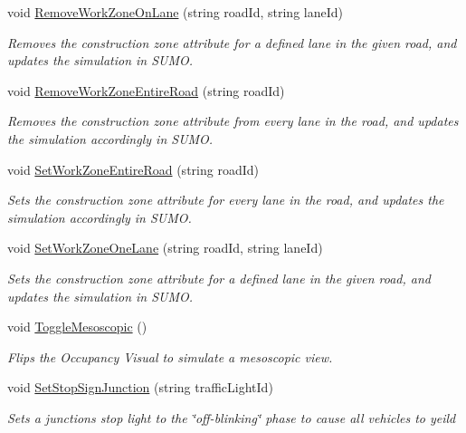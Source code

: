 \begin{DoxyCompactItemize}
\item 
void \mbox{\hyperlink{class_traci_controller_af8e5c5fefc5582cd12aeaca1b0663ac4}{Remove\+Work\+Zone\+On\+Lane}} (string road\+Id, string lane\+Id)
\begin{DoxyCompactList}\small\item\em Removes the construction zone attribute for a defined lane in the given road, and updates the simulation in S\+U\+MO. \end{DoxyCompactList}\item 
void \mbox{\hyperlink{class_traci_controller_a9678133938b5cf28566121ab6672dc34}{Remove\+Work\+Zone\+Entire\+Road}} (string road\+Id)
\begin{DoxyCompactList}\small\item\em Removes the construction zone attribute from every lane in the road, and updates the simulation accordingly in S\+U\+MO. \end{DoxyCompactList}\item 
void \mbox{\hyperlink{class_traci_controller_ae16a322e3cb2b298a8f52ceaa6661171}{Set\+Work\+Zone\+Entire\+Road}} (string road\+Id)
\begin{DoxyCompactList}\small\item\em Sets the construction zone attribute for every lane in the road, and updates the simulation accordingly in S\+U\+MO. \end{DoxyCompactList}\item 
void \mbox{\hyperlink{class_traci_controller_a5cb4324d12175bb8007433226d988561}{Set\+Work\+Zone\+One\+Lane}} (string road\+Id, string lane\+Id)
\begin{DoxyCompactList}\small\item\em Sets the construction zone attribute for a defined lane in the given road, and updates the simulation in S\+U\+MO. \end{DoxyCompactList}\item 
void \mbox{\hyperlink{class_traci_controller_a14b200d6e8bf71d6ae2391801b6eb51a}{Toggle\+Mesoscopic}} ()
\begin{DoxyCompactList}\small\item\em Flips the Occupancy Visual to simulate a mesoscopic view. \end{DoxyCompactList}\item 
void \mbox{\hyperlink{class_traci_controller_a033fdbe17b1d457bc59de0c2cdbe13ac}{Set\+Stop\+Sign\+Junction}} (string traffic\+Light\+Id)
\begin{DoxyCompactList}\small\item\em Sets a junction\textquotesingle{}s stop light to the \char`\"{}off-\/blinking\char`\"{} phase to cause all vehicles to yeild \end{DoxyCompactList}\item 

\end{DoxyCompactItemize}
